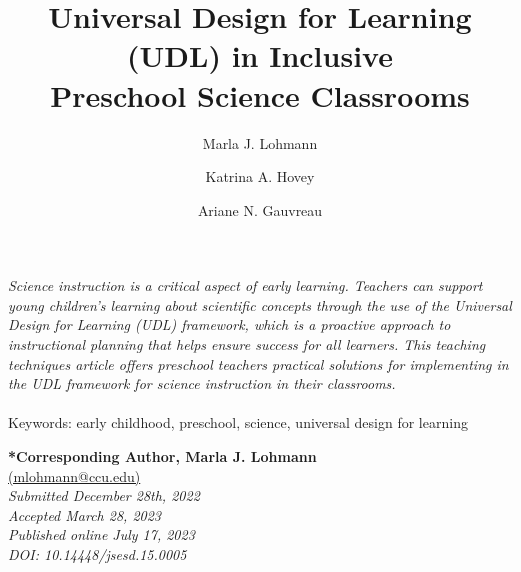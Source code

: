\documentclass[11.5pt]{sig-alternate}
\makeatletter
\let\oldabstract\abstract
\let\oldendabstract\endabstract
\renewenvironment{abstract}
{\renewenvironment{quotation}%
               {\list{}{\addtolength{\leftmargin}{1em} %
                        \listparindent 1.5em%
                        \itemindent    \listparindent%
                        \rightmargin   \leftmargin%
                        \parsep        \z@ \@plus\p@}%
                \item\relax}%
               {\endlist}%
\oldabstract}
{\oldendabstract}
\makeatother
\begin{document}
\title{Universal Design for Learning (UDL) in Inclusive \\Preschool Science Classrooms}

\author[1]{\large \color{blue} Marla J. Lohmann}
\author[2]{\large \color{blue} Katrina A. Hovey}
\author[3]{\large \color{blue}   Ariane N. Gauvreau}


\toappear{}

\maketitle

\begin{@twocolumnfalse} 

\begin{abstract}
\item 
     \textit{Science instruction is a critical aspect of early learning. Teachers can support young children’s learning about scientific concepts through the use of the Universal Design for Learning (UDL) framework, which is a proactive approach to instructional planning that helps ensure success for all learners. 
     This teaching techniques article offers preschool teachers practical solutions for implementing in the UDL framework for science instruction in their classrooms.}
     \\
     \\
     Keywords: early childhood, preschool, science, universal design for learning\\
\end{abstract}

\end{@twocolumnfalse}

\textbf{*Corresponding Author, Marla J. Lohmann} \\
\href{mailto:mlohmann@ccu.edu}{(mlohmann@ccu.edu)} \\
\textit{Submitted December 28th, 2022 }\\
\textit{Accepted March 28, 2023} \\
\textit{Published online July 17, 2023} \\
\textit{DOI: 10.14448/jsesd.15.0005} \\
\pagebreak
\pagebreak

\vspace{5mm}
\section*{\vspace{140mm}}
\end{document}
